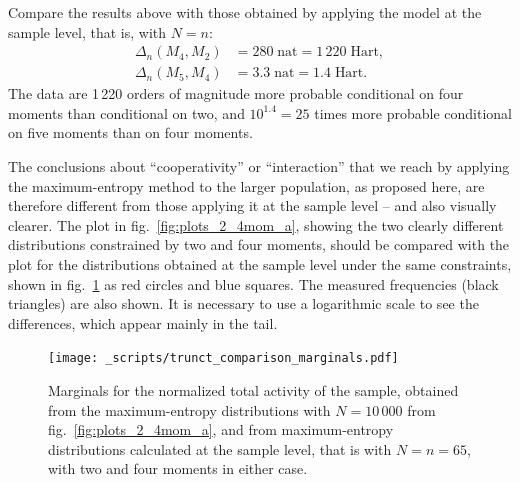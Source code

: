 \documentclass[\ifafour a4paper,12pt,\else a5paper,10pt,\fi%
onecolumn,oneside,article,%
british%
]{memoir}
\theoremstyle{remark}
\theoremstyle{innote}
\renewcommand*{\|}{\nonscript\,\vert\nonscript\;\mathopen{}}
\newcommand*{\fig}{fig.}%
\newcommand*{\ydi}{\varDelta}
\newcommand*{\nat}{\textrm{nat}}
\newcommand*{\hart}{\textrm{Hart}}
\begin{document}
\medskip

Compare the results above with those obtained by applying the model at the
sample level, that is, with $N=n$:
\begin{equation}
  \label{eq:diff_suff_n}
  \begin{split}
  \ydi_{n}(M_{4},M_{2}) &= 280\;\nat = 1\,220\;\hart,
\\    \ydi_{n}(M_{5},M_{4}) &= 3.3\;\nat = 1.4\;\hart.
\end{split}
\end{equation}
The data are 1\,220 orders of magnitude more probable conditional on four
moments than conditional on two, and $10^{1.4}=25$ times more probable
conditional on five moments than on four moments.

The conclusions about \enquote{cooperativity} or \enquote{interaction} that
we reach by applying the maximum-entropy method to the larger population,
as proposed here, are therefore different from those applying it at the
sample level -- and also visually clearer. The plot in 
\fig~\ref{fig:plots_2_4mom_a}, showing the two clearly different
distributions constrained by two and four moments, should be compared with
the plot for the distributions obtained at the sample level under the same
constraints, shown in \fig~\ref{fig:comparisons_marginals} as
\textcolor{myred}{red circles} and \textcolor{myblue}{blue squares}. The
measured frequencies (black triangles) are also shown. It is necessary to
use a logarithmic scale to see the differences, which appear mainly in the
tail.
\begin{figure}[!p]
\centering
\texttt{[image: \_scripts/trunct\_comparison\_marginals.pdf]}%
\caption{Marginals for the normalized total activity of the sample,
  obtained from the maximum-entropy distributions with $N=10\,000$ from
  \fig~\ref{fig:plots_2_4mom_a}, and from maximum-entropy distributions
  calculated at the sample level, that is with $N=n=65$, with two and four
  moments in either case.}
\label{fig:comparisons_marginals}
\end{figure}

\medskip

\end{document}
